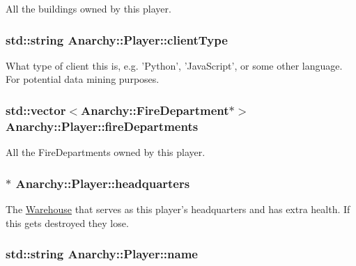 All the buildings owned by this player. 

\hypertarget{classAnarchy_1_1Player_af5b7bce5d4d05b69d8b83d095f3ab39e}{
\subsubsection[{client\-Type}]{\setlength{\rightskip}{0pt plus 5cm}std\-::string Anarchy\-::\-Player\-::client\-Type}}\label{classAnarchy_1_1Player_af5b7bce5d4d05b69d8b83d095f3ab39e}


What type of client this is, e.\-g. 'Python', 'Java\-Script', or some other language. For potential data mining purposes. 

\hypertarget{classAnarchy_1_1Player_a9ef8ddd89632fa942b09c5d5f47d432c}{
\subsubsection[{fire\-Departments}]{\setlength{\rightskip}{0pt plus 5cm}std\-::vector$<${\bf Anarchy\-::\-Fire\-Department}$\ast$$>$ Anarchy\-::\-Player\-::fire\-Departments}}\label{classAnarchy_1_1Player_a9ef8ddd89632fa942b09c5d5f47d432c}


All the Fire\-Departments owned by this player. 

\hypertarget{classAnarchy_1_1Player_a175881daf024ff4b2ed8b7b7d0a8ab6b}{
\subsubsection[{headquarters}]{$\ast$ Anarchy\-::\-Player\-::headquarters}}\label{classAnarchy_1_1Player_a175881daf024ff4b2ed8b7b7d0a8ab6b}


The \hyperlink{classAnarchy_1_1Warehouse}{Warehouse} that serves as this player's headquarters and has extra health. If this gets destroyed they lose. 

\hypertarget{classAnarchy_1_1Player_aafaac857aee9c030ae5908678eef613d}{
\subsubsection[{name}]{\setlength{\rightskip}{0pt plus 5cm}std\-::string Anarchy\-::\-Player\-::name}}\label{classAnarchy_1_1Player_aafaac857aee9c030ae5908678eef613d}


